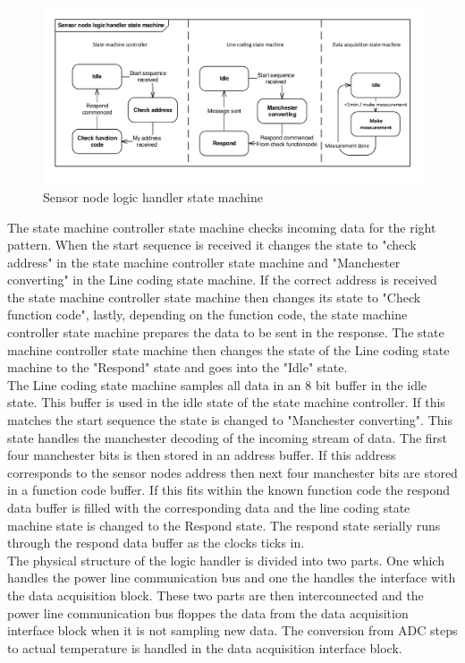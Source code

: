 \begin{figure}[H]
	\centering
	\includegraphics[width=1\textwidth]{billeder/logic_handler_stm}
	\caption{Sensor node logic handler state machine}
\end{figure}

The state machine controller state machine checks incoming data for the right pattern. When the start sequence is received it changes the state to "check address" in the state machine controller state machine and "Manchester converting" in the Line coding state machine. If the correct address is received the state machine controller state machine then changes its state to "Check function code", lastly, depending on the function code, the state machine controller state machine prepares the data to be sent in the response. The state machine controller state machine then changes the state of the Line coding state machine to the "Respond" state and goes into the "Idle" state.\\
The Line coding state machine samples all data in an 8 bit buffer in the idle state. This buffer is used in the idle state of the state machine controller. If this matches the start sequence the state is changed to "Manchester converting". This state handles the manchester decoding of the incoming stream of data. The first four manchester bits is then stored in an address buffer. If this address corresponds to the sensor nodes address then next four manchester bits are stored in a function code buffer. If this fits within the known function code the respond data buffer is filled with the corresponding data and the line coding state machine state is changed to the Respond state. The respond state serially runs through the respond data buffer as the clocks ticks in.\\

The physical structure of the logic handler is divided into two parts. One which handles the power line communication bus and one the handles the interface with the data acquisition block. These two parts are then interconnected and the power line communication bus floppes the data from the data acquisition interface block when it is not sampling new data. The conversion from ADC steps to actual temperature is handled in the data acquisition interface block.


